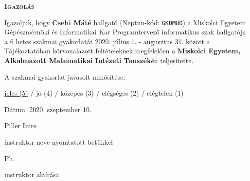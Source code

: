 \documentclass[a4paper, 14pt]{extarticle}
\begin{document}

\pagestyle{empty}

\begin{center}
\textbf{\textsc{Igazolás}}
\end{center}

\vskip 1cm

\noindent Igazoljuk, hogy \textbf{Csehi Máté} hallgató (Neptun-kód: \texttt{GKDM8D})
a Miskolci Egyetem Gépészmérnöki és Informatikai Kar Programtervező informatikus szak hallgatója a 6 hetes szakmai gyakorlatát
2020. július 1. - augusztus 31. között a Tájékoztatóban körvonalazott feltételeknek megfelelően a \textbf{Miskolci Egyetem, Alkalmazott Matematikai Intézeti Tanszék}én teljesítette.

\vskip 1cm

\noindent A szakmai gyakorlat javasolt minősítése:

\noindent \underline{jeles (5)} / jó (4) / közepes (3) / elégséges (2) / elégtelen (1)

\vskip 2cm

\noindent Dátum: 2020. szeptember 10.

\vskip 1cm

\hskip 10cm Piller Imre

\hskip 7cm instruktor neve nyomtatott betűkkel

\vskip 1cm

\hskip 2cm Ph.

\vskip 1cm

\hskip 9cm instruktor aláírása
\end{document}

